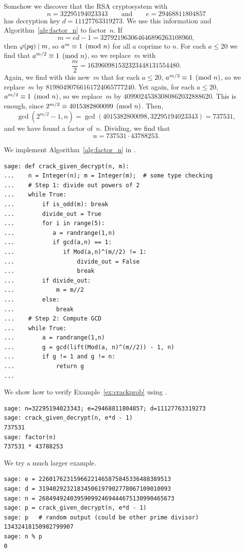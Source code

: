 \begin{example}\label{ex:crackprob}
Somehow we discover that the RSA cryptosystem with
$$
n=32295194023343\qquad\text{and}\qquad e=29468811804857
$$
has decryption
key $d= 11127763319273$.  We use this information and
Algorithm~\ref{alg:factor_n} to factor~$n$.
If
$$m = ed-1 = 327921963064646896263108960,$$
then $\varphi(pq)\mid m$, so $a^m\equiv 1\pmod{n}$
for all $a$ coprime to $n$.
For each $a\leq 20$ we find that
$a^{m/2}\equiv 1\pmod{n}$, so we replace~$m$ with
$$\frac{m}{2}= 163960981532323448131554480.$$
Again, we find with this new~$m$ that
for each $a\leq 20$,
$a^{m/2}\equiv 1\pmod{n}$, so we replace~$m$ by
$81980490766161724065777240$.
Yet again, for each $a\leq 20$,
$a^{m/2}\equiv 1\pmod{n}$, so we replace~$m$
by $40990245383080862032888620$.
This is enough, since
$2^{m/2} \equiv 4015382800099\pmod{n}$.
Then,
$$
  \gcd(2^{m/2}-1,n) = \gcd(4015382800098,32295194023343) = 737531,
$$
and we have found a factor of~$n$.  Dividing, we find that
$$
  n = 737531 \cdot 43788253.
$$
\end{example}
\begin{sg}
We implement Algorithm~\ref{alg:factor_n} in \sage.
\begin{verbatim}
sage: def crack_given_decrypt(n, m):
...    n = Integer(n); m = Integer(m);  # some type checking
...    # Step 1: divide out powers of 2
...    while True:
...        if is_odd(m): break
...        divide_out = True
...        for i in range(5):
...           a = randrange(1,n)
...           if gcd(a,n) == 1:
...              if Mod(a,n)^(m//2) != 1:
...                  divide_out = False
...                  break
...        if divide_out:
...            m = m//2
...        else:
...            break
...    # Step 2: Compute GCD
...    while True:
...        a = randrange(1,n)
...        g = gcd(lift(Mod(a, n)^(m//2)) - 1, n)
...        if g != 1 and g != n:
...            return g
...
\end{verbatim}%
\noindent{}We show how to verify Example~\ref{ex:crackprob} using \sage.
\begin{verbatim}
sage: n=32295194023343; e=29468811804857; d=11127763319273
sage: crack_given_decrypt(n, e*d - 1)
737531
sage: factor(n)
737531 * 43788253
\end{verbatim}%

\noindent{}We try a much larger example.
\begin{verbatim}
sage: e = 22601762315966221465875845336488389513
sage: d = 31940292321834506197902778067109010093
sage: n = 268494924039590992469444675130990465673
sage: p = crack_given_decrypt(n, e*d - 1)
sage: p   # random output (could be other prime divisor)
13432418150982799907
sage: n % p
0
\end{verbatim}
\end{sg}

